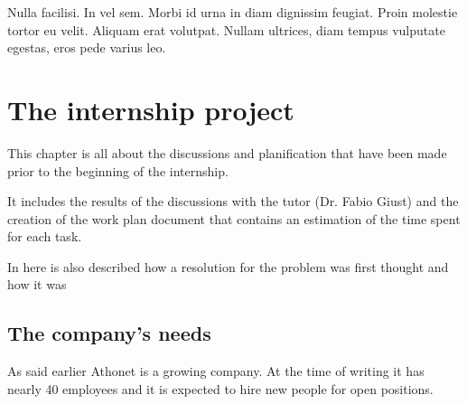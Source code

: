 \begin{savequote}[75mm]
Nulla facilisi. In vel sem. Morbi id urna in diam dignissim feugiat. Proin molestie tortor eu velit. Aliquam erat volutpat. Nullam ultrices, diam tempus vulputate egestas, eros pede varius leo.
\end{savequote}

\chapter{The internship project}



This chapter is all about the discussions and planification that have been made prior to the beginning of the internship.

It includes the results of the discussions with the tutor (Dr. Fabio Giust) and the creation of the work plan document that contains an estimation of the time spent for each task.

In here is also described how a resolution for the problem was first thought and how it was 

\section{The company's needs}

	As said earlier Athonet is a growing company.
	At the time of writing it has nearly 40 employees and it is expected to hire new people for open positions.
	
